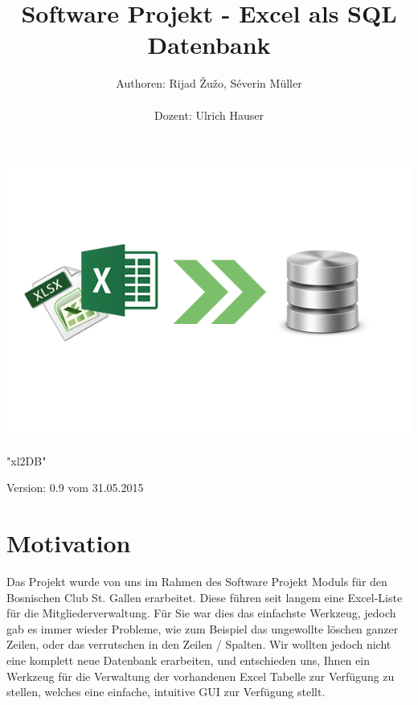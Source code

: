 \documentclass{article}
\begin{document}
\begin{titlepage}



\title{Software Projekt - Excel als SQL Datenbank}
\author{Authoren: Rijad \v{Z}u\v{z}o, Séverin Müller \\ \\ Dozent: Ulrich Hauser}



\date{} 
\clearpage\maketitle
\thispagestyle{empty}

\vspace{80mm}
\begin{center}
		\includegraphics[width=0.8 \textwidth]{SoftwareLogo}
\end{center}
\centering \huge "xl2DB"

\centering \normalsize Version: 0.9 vom 31.05.2015
\end{titlepage}
\newpage
\tableofcontents
\vspace{-5mm}
\listoffigures
\newpage



\section{Motivation}
Das Projekt wurde von uns im Rahmen des Software Projekt Moduls für den Bosnischen Club St. Gallen erarbeitet. Diese führen seit langem eine Excel-Liste für die Mitgliederverwaltung. \newline 
Für Sie war dies das einfachste Werkzeug, jedoch gab es immer wieder Probleme, wie zum Beispiel das ungewollte löschen ganzer Zeilen, oder das verrutschen in den Zeilen / Spalten. Wir wollten jedoch nicht eine komplett neue Datenbank erarbeiten, und entschieden uns, Ihnen ein Werkzeug für die Verwaltung der vorhandenen Excel Tabelle zur Verfügung zu stellen, welches eine einfache, intuitive GUI zur Verfügung stellt.
\end{document}
